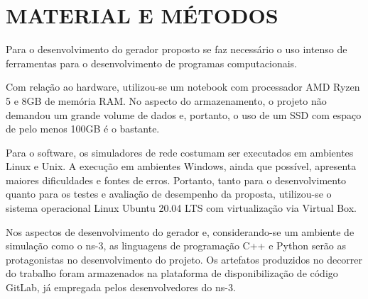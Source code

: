 \section{MATERIAL E MÉTODOS}

Para o desenvolvimento do gerador proposto se faz necessário o uso intenso de ferramentas para o desenvolvimento de programas computacionais. 

Com relação ao hardware, utilizou-se um notebook com processador AMD Ryzen 5 e 8GB de memória RAM. No aspecto do armazenamento, o projeto não demandou um grande volume de dados e, portanto, o uso de um SSD com espaço de pelo menos 100GB é o bastante.

Para o software, os simuladores de rede costumam ser executados em ambientes Linux e Unix. A execução em ambientes Windows, ainda que possível, apresenta maiores dificuldades e fontes de erros. Portanto, tanto para o desenvolvimento quanto para os testes e avaliação de desempenho da proposta, utilizou-se o sistema operacional Linux Ubuntu 20.04 LTS com virtualização via Virtual Box.


Nos aspectos de desenvolvimento do gerador e, considerando-se um ambiente de simulação como o ns-3, as linguagens de programação C++ e Python serão as protagonistas no desenvolvimento do projeto. Os artefatos produzidos no decorrer do trabalho foram armazenados na plataforma de disponibilização de código GitLab, já empregada pelos desenvolvedores do ns-3.

